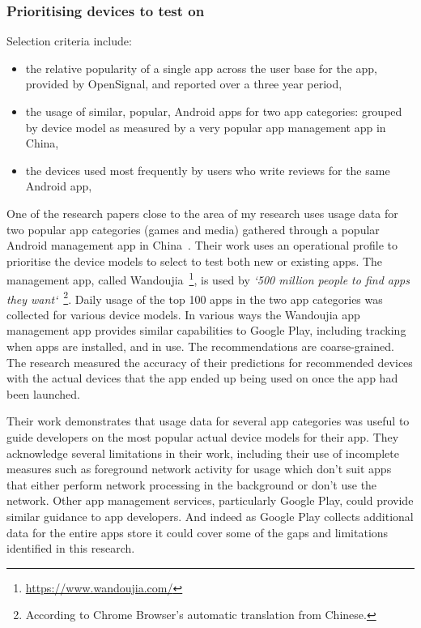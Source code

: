 \subsubsection{Prioritising devices to test on}

Selection criteria include:
\begin{itemize}
    \item the relative popularity of a single app across the user base for the app, provided by OpenSignal, and reported over a three year period,
    \item the usage of similar, popular, Android apps for two app categories: grouped by device model as measured by a very popular app management app in China,
    \item the devices used most frequently by users who write reviews for the same Android app,
\end{itemize}

One of the research papers close to the area of my research uses usage data for two popular app categories (games and media) gathered through a popular Android management app in China~\cite{lu2016_PRADA}. Their work uses an operational profile to prioritise the device models to select to test both new or existing apps. The management app, called Wandoujia~\footnote{\url{https://www.wandoujia.com/}}, is used by \emph{`500 million people to find apps they want`}~\footnote{According to Chrome Browser's automatic translation from Chinese.}. Daily usage of the top 100 apps in the two app categories was collected for various device models. In various ways the Wandoujia app management app provides similar capabilities to Google Play, including tracking when apps are installed, and in use. The recommendations are coarse-grained. The research measured the accuracy of their predictions for recommended devices with the actual devices that the app ended up being used on once the app had been launched. 

Their work demonstrates that usage data for several app categories was useful to guide developers on the most popular actual device models for their app. They acknowledge several limitations in their work, including their use of incomplete measures such as foreground network activity for usage which don't suit apps that either perform network processing in the background or don't use the network. Other app management services, particularly Google Play, could provide similar guidance to app developers. And indeed as Google Play collects additional data for the entire apps store it could cover some of the gaps and limitations identified in this research.


